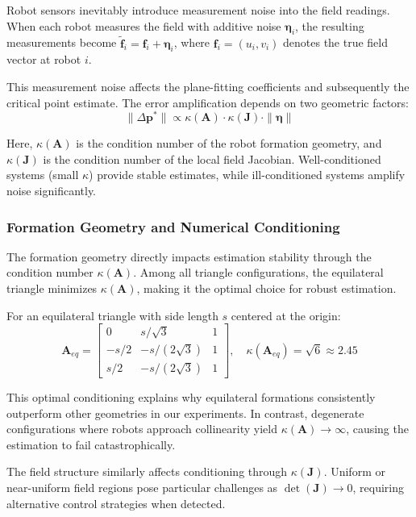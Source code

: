 \documentclass[lettersize,journal]{IEEEtran}
\begin{document}
Robot sensors inevitably introduce measurement noise into the field readings. When each robot measures the field with additive noise $\boldsymbol{\eta}_i$, the resulting measurements become $\tilde{\mathbf{f}}_i = \mathbf{f}_i + \boldsymbol{\eta}_i$, where $\mathbf{f}_i = (u_i, v_i)$ denotes the true field vector at robot $i$.

This measurement noise affects the plane-fitting coefficients and subsequently the critical point estimate. The error amplification depends on two geometric factors:
\begin{equation}
\|\Delta\mathbf{p}^*\| \propto \kappa(\mathbf{A}) \cdot \kappa(\mathbf{J}) \cdot \|\boldsymbol{\eta}\|
\end{equation}

Here, $\kappa(\mathbf{A})$ is the condition number of the robot formation geometry, and $\kappa(\mathbf{J})$ is the condition number of the local field Jacobian. Well-conditioned systems (small $\kappa$) provide stable estimates, while ill-conditioned systems amplify noise significantly.

\subsubsection{Formation Geometry and Numerical Conditioning}

The formation geometry directly impacts estimation stability through the condition number $\kappa(\mathbf{A})$. Among all triangle configurations, the equilateral triangle minimizes $\kappa(\mathbf{A})$, making it the optimal choice for robust estimation.

For an equilateral triangle with side length $s$ centered at the origin:
\begin{equation}
\mathbf{A}_{eq} = \begin{bmatrix}
0 & s/\sqrt{3} & 1 \\
-s/2 & -s/(2\sqrt{3}) & 1 \\
s/2 & -s/(2\sqrt{3}) & 1
\end{bmatrix}, \quad \kappa(\mathbf{A}_{eq}) = \sqrt{6} \approx 2.45
\end{equation}

This optimal conditioning explains why equilateral formations consistently outperform other geometries in our experiments. In contrast, degenerate configurations where robots approach collinearity yield $\kappa(\mathbf{A}) \to \infty$, causing the estimation to fail catastrophically.

The field structure similarly affects conditioning through $\kappa(\mathbf{J})$. Uniform or near-uniform field regions pose particular challenges as $\det(\mathbf{J}) \to 0$, requiring alternative control strategies when detected.
\end{document}
